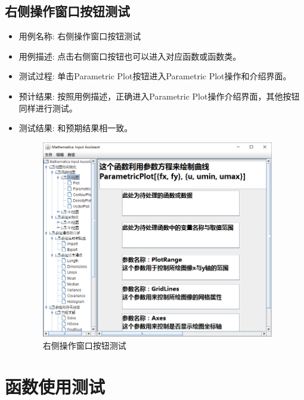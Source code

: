 \documentclass[hyperref, UTF8
,bookmarksnumbered=true, oneside]{ctexbook}
\begin{document}
		\subsection{右侧操作窗口按钮测试} %
		\begin{itemize}
			\item 用例名称: 右侧操作窗口按钮测试
			\item 用例描述: 点击右侧窗口按钮也可以进入对应函数或函数类。
			\item 测试过程: 单击Parametric Plot按钮进入Parametric Plot操作和介绍界面。
			\item 预计结果: 按照用例描述，正确进入Parametric Plot操作介绍界面，其他按钮同样进行测试。
			\item 测试结果:	和预期结果相一致。

				\begin{figure}[!h]
                	\centering
                	\includegraphics[width=4in]{5.png}
                	\caption{右侧操作窗口按钮测试}    
                	\label{pic:MathObject}
            	\end{figure}

		\end{itemize}
	

	\section{函数使用测试} %
\end{document}
